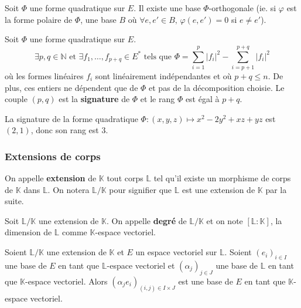   \begin{lemma}
    Soit $\Phi$ une forme quadratique sur $E$. Il existe une base $\Phi$-orthogonale (ie. si $\varphi$ est la forme polaire de $\Phi$, une base $B$ où $\forall e, e' \in B, \, \varphi(e, e') = 0$ si $e \neq e'$).
  \end{lemma}


  \begin{theorem}
    Soit $\Phi$ une forme quadratique sur $E$.
    \[ \exists p, q \in \mathbb{N} \text{ et } \exists f_1, \dots, f_{p+q} \in E^* \text{ tels que } \Phi = \sum_{i=1}^p |f_i|^2 - \sum_{i=p+1}^{p+q} |f_i|^2 \]
    où les formes linéaires $f_i$ sont linéairement indépendantes et où $p + q \leq n$. De plus, ces entiers ne dépendent que de $\Phi$ et pas de la décomposition choisie.
    \newpar
    Le couple $(p,q)$ est la \textbf{signature} de $\Phi$ et le rang $\Phi$ est égal à $p+q$.
  \end{theorem}

  \begin{example}
    La signature de la forme quadratique $\Phi : (x,y,z) \mapsto x^2 - 2y^2 + xz + yz$ est $(2,1)$, donc son rang est $3$.
  \end{example}

  \subsubsection{Extensions de corps}


  \begin{definition}
    On appelle \textbf{extension} de $\mathbb{K}$ tout corps $\mathbb{L}$ tel qu'il existe un morphisme de corps de $\mathbb{K}$ dans $\mathbb{L}$. On notera $\mathbb{L} / \mathbb{K}$ pour signifier que $\mathbb{L}$ est une extension de $\mathbb{K}$ par la suite.
  \end{definition}

  \begin{definition}
    Soit $\mathbb{L}/\mathbb{K}$ une extension de $\mathbb{K}$. On appelle \textbf{degré} de $\mathbb{L}/\mathbb{K}$ et on note $[\mathbb{L}:\mathbb{K}]$, la dimension de $\mathbb{L}$ comme $\mathbb{K}$-espace vectoriel.
  \end{definition}

  \begin{theorem}
    Soient $\mathbb{L}/\mathbb{K}$ une extension de $\mathbb{K}$ et $E$ un espace vectoriel sur $\mathbb{L}$.
    Soient $(e_i)_{i \in I}$ une base de $E$ en tant que $\mathbb{L}$-espace vectoriel et $(\alpha_j)_{j \in J}$ une base de $\mathbb{L}$ en tant que $\mathbb{K}$-espace vectoriel.
    \newpar
    Alors $(\alpha_j e_i)_{(i,j) \in I \times J}$ est une base de $E$ en tant que $\mathbb{K}$-espace vectoriel.
  \end{theorem}

